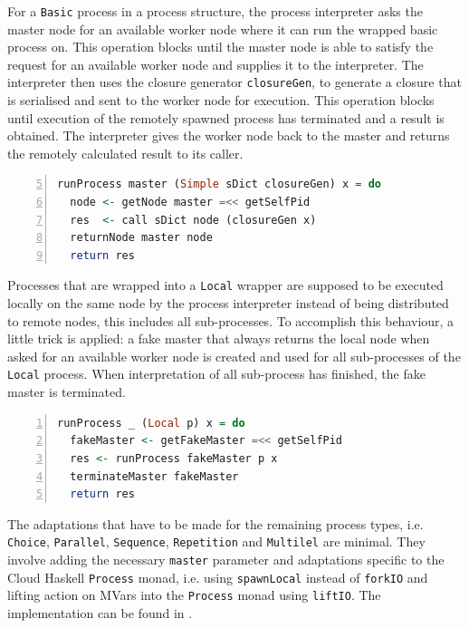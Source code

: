 For a \texttt{Basic} process in a process structure, the process interpreter asks the master node for an available worker node where it can run the wrapped basic process on. This operation blocks until the master node is able to satisfy the request for an available worker node and supplies it to the interpreter. The interpreter then uses the closure generator \texttt{closureGen}, to generate a closure that is serialised and sent to the worker node for execution. This operation blocks until execution of the remotely spawned process has terminated and a result is obtained. The interpreter gives the worker node back to the master and returns the remotely calculated result to its caller.
\begin{lstlisting}[language=Haskell,caption=Implementation of the interpreter for \texttt{Simple} processes.,label=lst:runprocess_simple,numbers=left,frame=bt,firstnumber=5]
runProcess master (Simple sDict closureGen) x = do
  node <- getNode master =<< getSelfPid
  res  <- call sDict node (closureGen x)
  returnNode master node
  return res
\end{lstlisting}

Processes that are wrapped into a \texttt{Local} wrapper are supposed to be executed locally on the same node by the process interpreter instead of being distributed to remote nodes, this includes all sub-processes. To accomplish this behaviour, a little trick is applied: a fake master that always returns the local node when asked for an available worker node is created and used for all sub-processes of the \texttt{Local} process. When interpretation of all sub-process has finished, the fake master is terminated.
\begin{lstlisting}[language=Haskell,caption=Implementation of the interpreter for \texttt{Local} processes.,label=lst:runprocess_local,numbers=left,frame=bt]
runProcess _ (Local p) x = do
  fakeMaster <- getFakeMaster =<< getSelfPid
  res <- runProcess fakeMaster p x
  terminateMaster fakeMaster
  return res
\end{lstlisting}

The adaptations that have to be made for the remaining process types, i.e. \texttt{Choice}, \texttt{Parallel}, \texttt{Sequence}, \texttt{Repetition} and \texttt{Multilel} are minimal. They involve adding the necessary \texttt{master} parameter and adaptations specific to the \textsf{Cloud Haskell} \texttt{Process} monad, i.e. using \texttt{spawnLocal} instead of \texttt{forkIO} and lifting action on MVars into the \texttt{Process} monad using \texttt{liftIO}. The implementation can be found in .


